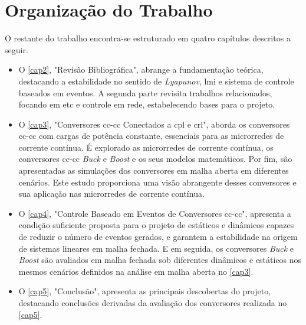 \section{Organização do Trabalho}

O restante do trabalho encontra-se estruturado em quatro capítulos descritos a seguir.


\begin{itemize}
    \item O \autoref{cap2}, "Revisão Bibliográfica", abrange a fundamentação teórica, destacando a estabilidade no sentido de \textit{Lyapunov}, \acrfull{lmi} e sistema de controle baseados em eventos. A segunda parte revisita trabalhos relacionados, focando em \acrshort{etc} e controle em rede, estabelecendo bases para o projeto.
    \item O \autoref{cap3}, "Conversores \acrshort{cc}-\acrshort{cc} Conectados a \acrshort{cpl} e \acrshort{crl}", aborda os conversores \acrshort{cc}-\acrshort{cc} com cargas de potência constante, essenciais para as microrredes de corrente contínua. É explorado as microrredes de corrente contínua, os conversores \acrshort{cc}-\acrshort{cc} \textit{Buck} e \textit{Boost} e os seus modelos matemáticos. Por fim, são apresentadas as simulações dos conversores em malha aberta em diferentes cenários. Este estudo proporciona uma visão abrangente desses conversores e sua aplicação nas microrredes de corrente contínua.
    \item O \autoref{cap4}, "Controle Baseado em Eventos de Conversores \acrshort{cc}-\acrshort{cc}", apresenta a condição suficiente proposta para o projeto de  estáticos e dinâmicos capazes de reduzir o número de eventos gerados, e garantem a estabilidade na origem de sistemas lineares em malha fechada. E em seguida, os conversores \textit{Buck} e \textit{Boost} são avaliados em malha fechada sob diferentes  dinâmicos e estáticos nos mesmos cenários definidos na análise em malha aberta no \autoref{cap3}.  
    \item O \autoref{cap5}, "Conclusão", apresenta as principais descobertas do projeto, destacando conclusões derivadas da avaliação dos conversores realizada no \autoref{cap5}.
\end{itemize}



